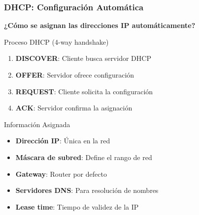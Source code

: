 \documentclass[aspectratio=169]{beamer}
\begin{document}
            \begin{frame}
            \frametitle{DHCP: Configuración Automática}
            
            \begin{center}
            \Large \textbf{¿Cómo se asignan las direcciones IP automáticamente?}
            \end{center}
            
            \begin{block}{Proceso DHCP (4-way handshake)}
            \begin{enumerate}
            \item \textbf{DISCOVER}: Cliente busca servidor DHCP
            \item \textbf{OFFER}: Servidor ofrece configuración
            \item \textbf{REQUEST}: Cliente solicita la configuración
            \item \textbf{ACK}: Servidor confirma la asignación
            \end{enumerate}
            \end{block}
            
            
            \begin{block}{Información Asignada}
            \begin{itemize}
            \item \textbf{Dirección IP}: Única en la red
            \item \textbf{Máscara de subred}: Define el rango de red
            \item \textbf{Gateway}: Router por defecto
            \item \textbf{Servidores DNS}: Para resolución de nombres
            \item \textbf{Lease time}: Tiempo de validez de la IP
            \end{itemize}
            \end{block}
          \end{frame} 
\end{document}
